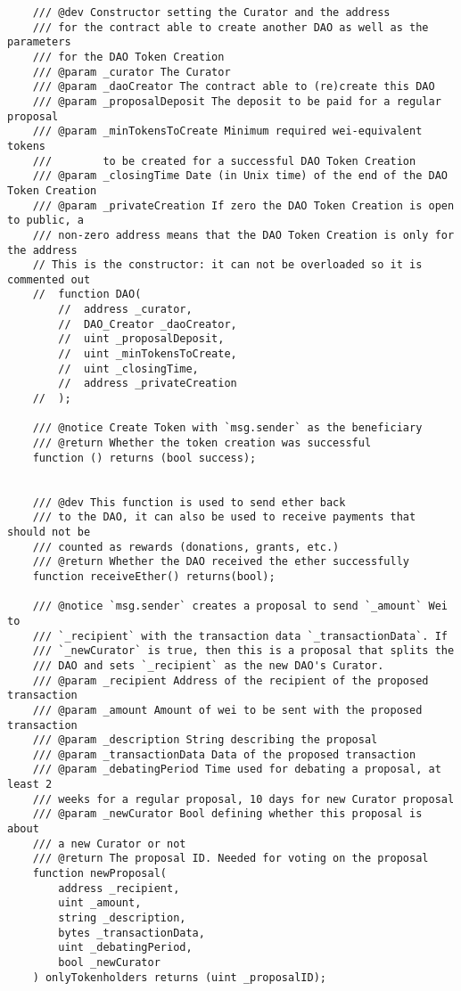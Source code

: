 \documentclass[9pt,oneside]{amsart}
\begin{document}
\begin{appendix}
\begin{verbatim}
    /// @dev Constructor setting the Curator and the address
    /// for the contract able to create another DAO as well as the parameters
    /// for the DAO Token Creation
    /// @param _curator The Curator
    /// @param _daoCreator The contract able to (re)create this DAO
    /// @param _proposalDeposit The deposit to be paid for a regular proposal
    /// @param _minTokensToCreate Minimum required wei-equivalent tokens
    ///        to be created for a successful DAO Token Creation
    /// @param _closingTime Date (in Unix time) of the end of the DAO Token Creation
    /// @param _privateCreation If zero the DAO Token Creation is open to public, a
    /// non-zero address means that the DAO Token Creation is only for the address
    // This is the constructor: it can not be overloaded so it is commented out
    //  function DAO(
        //  address _curator,
        //  DAO_Creator _daoCreator,
        //  uint _proposalDeposit,
        //  uint _minTokensToCreate,
        //  uint _closingTime,
        //  address _privateCreation
    //  );

    /// @notice Create Token with `msg.sender` as the beneficiary
    /// @return Whether the token creation was successful
    function () returns (bool success);


    /// @dev This function is used to send ether back
    /// to the DAO, it can also be used to receive payments that should not be
    /// counted as rewards (donations, grants, etc.)
    /// @return Whether the DAO received the ether successfully
    function receiveEther() returns(bool);

    /// @notice `msg.sender` creates a proposal to send `_amount` Wei to
    /// `_recipient` with the transaction data `_transactionData`. If
    /// `_newCurator` is true, then this is a proposal that splits the
    /// DAO and sets `_recipient` as the new DAO's Curator.
    /// @param _recipient Address of the recipient of the proposed transaction
    /// @param _amount Amount of wei to be sent with the proposed transaction
    /// @param _description String describing the proposal
    /// @param _transactionData Data of the proposed transaction
    /// @param _debatingPeriod Time used for debating a proposal, at least 2
    /// weeks for a regular proposal, 10 days for new Curator proposal
    /// @param _newCurator Bool defining whether this proposal is about
    /// a new Curator or not
    /// @return The proposal ID. Needed for voting on the proposal
    function newProposal(
        address _recipient,
        uint _amount,
        string _description,
        bytes _transactionData,
        uint _debatingPeriod,
        bool _newCurator
    ) onlyTokenholders returns (uint _proposalID);


\end{verbatim}
\end{appendix}
\end{document}
